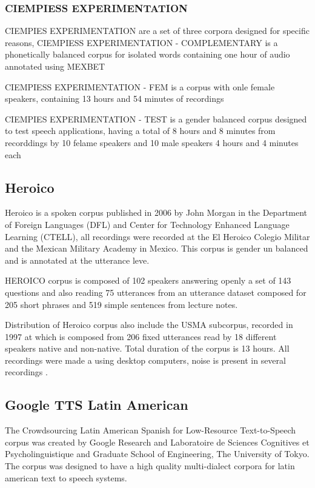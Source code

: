 \documentclass[10pt, a4paper]{article}
\begin{document}
\subsubsection{CIEMPIESS EXPERIMENTATION}

CIEMPIES EXPERIMENTATION are a set of three corpora designed for specific reasons, CIEMPIESS EXPERIMENTATION - COMPLEMENTARY is a phonetically balanced corpus for isolated words containing one hour of audio annotated using MEXBET

CIEMPIESS EXPERIMENTATION - FEM is a corpus with onle female speakers, containing 13 hours and 54 minutes of recordings

CIEMPIES EXPERIMENTATION - TEST is a gender balanced corpus designed to test speech applications, having a total of 8 hours and 8 minutes from recorddings by 10 felame speakers and 10 male speakers 4 hours and 4 minutes each

\subsection{Heroico}

Heroico is a spoken corpus published in 2006 by John Morgan in the Department of Foreign Languages (DFL) and Center for Technology Enhanced Language Learning (CTELL), all recordings were recorded at the El Heroico Colegio Militar and the Mexican Military Academy in Mexico. This corpus is gender un balanced and is annotated at the utterance leve.


HEROICO corpus is composed of 102 speakers answering openly a set of 143 questions and also reading 75 utterances from an utterance dataset composed for 205 short phrases and 519 simple sentences from lecture notes.

Distribution of Heroico corpus also include the USMA subcorpus, recorded in 1997 at which is composed from 206 fixed utterances read by 18 different speakers native and non-native. Total duration of the corpus is 13 hours. All recordings were made a using desktop computers, noise is present in several recordings \cite{heroico}.
 
\subsection{Google TTS Latin American}

The Crowdsourcing Latin American Spanish for Low-Resource Text-to-Speech corpus was created by Google Research and Laboratoire de Sciences Cognitives et Psycholinguistique and Graduate School of Engineering, The University of Tokyo. The corpus was designed to have a high quality multi-dialect corpora for latin american text to speech systems.
\end{document}
